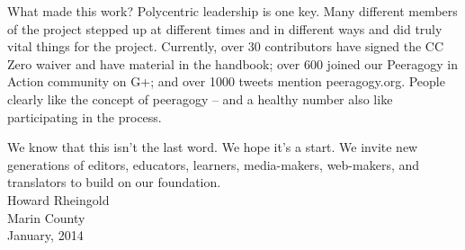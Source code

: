 What made this work? Polycentric leadership is one key. Many different
members of the project stepped up at different times and in different
ways and did truly vital things for the project. Currently, over 30
contributors have signed the CC Zero waiver and have material in the
handbook; over 600 joined our Peeragogy in Action community on G+; and
over 1000 tweets mention peeragogy.org. People clearly like the concept
of peeragogy -- and a healthy number also like participating in the
process.

We know that this isn't the last word. We hope it's a start. We invite
new generations of editors, educators, learners, media-makers,
web-makers, and translators to build on our foundation.\\[.2cm]

{\flushright\noindent Howard Rheingold\\ Marin County\\ January, 2014 }
